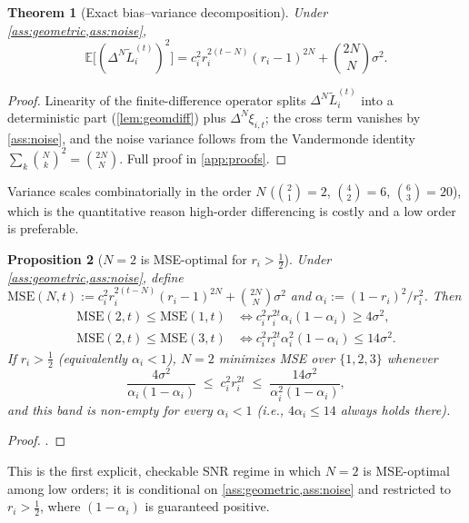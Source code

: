 \documentclass{article}
\theoremstyle{plain}
\newtheorem{theorem}{Theorem}[section]
\newtheorem{proposition}[theorem]{Proposition}
\theoremstyle{definition}
\theoremstyle{remark}
\begin{document}
\begin{theorem}[Exact bias--variance decomposition]
\label{thm:bv}
Under \cref{ass:geometric,ass:noise},
\begin{equation}
\label{eq:bv}
\mathbb E\big[(\Delta^N \tilde L_i^{(t)})^2\big] = c_i^2 r_i^{2(t-N)}(r_i-1)^{2N} + \binom{2N}{N}\sigma^2.
\end{equation}
\end{theorem}
\begin{proof}
Linearity of the finite-difference operator splits $\Delta^N\tilde L_i^{(t)}$ into a deterministic part (\cref{lem:geomdiff}) plus $\Delta^N\xi_{i,t}$; the cross term vanishes by \cref{ass:noise}, and the noise variance follows from the Vandermonde identity $\sum_k \binom{N}{k}^2 = \binom{2N}{N}$. Full proof in \cref{app:proofs}.
\end{proof}

Variance scales combinatorially in the order $N$ ($\binom{2}{1}=2$, $\binom{4}{2}=6$, $\binom{6}{3}=20$), which is the quantitative reason high-order differencing is costly and a low order is preferable.

\begin{proposition}[$N=2$ is MSE-optimal for $r_i>\tfrac12$]
\label{prop:mse}
Under \cref{ass:geometric,ass:noise}, define $\mathrm{MSE}(N,t) := c_i^2 r_i^{2(t-N)}(r_i-1)^{2N} + \binom{2N}{N}\sigma^2$ and $\alpha_i := (1-r_i)^2/r_i^2$. Then
\begin{align}
\mathrm{MSE}(2,t)\!\le\!\mathrm{MSE}(1,t) &\iff c_i^2 r_i^{2t}\alpha_i(1-\alpha_i) \ge 4\sigma^2, \label{eq:mse12}\\
\mathrm{MSE}(2,t)\!\le\!\mathrm{MSE}(3,t) &\iff c_i^2 r_i^{2t}\alpha_i^2(1-\alpha_i) \le 14\sigma^2. \label{eq:mse23}
\end{align}
If $r_i>\tfrac12$ (equivalently $\alpha_i<1$), $N=2$ minimizes MSE over $\{1,2,3\}$ whenever
\begin{equation}
\label{eq:band}
\frac{4\sigma^2}{\alpha_i(1-\alpha_i)} \;\le\; c_i^2 r_i^{2t} \;\le\; \frac{14\sigma^2}{\alpha_i^2(1-\alpha_i)},
\end{equation}
and this band is non-empty for every $\alpha_i<1$ (i.e., $4\alpha_i \le 14$ always holds there).
\end{proposition}
\begin{proof}
.
\end{proof}

This is the first explicit, checkable SNR regime in which $N=2$ is MSE-optimal among low orders; it is conditional on \cref{ass:geometric,ass:noise} and restricted to $r_i>\tfrac12$, where $(1-\alpha_i)$ is guaranteed positive.
\end{document}
